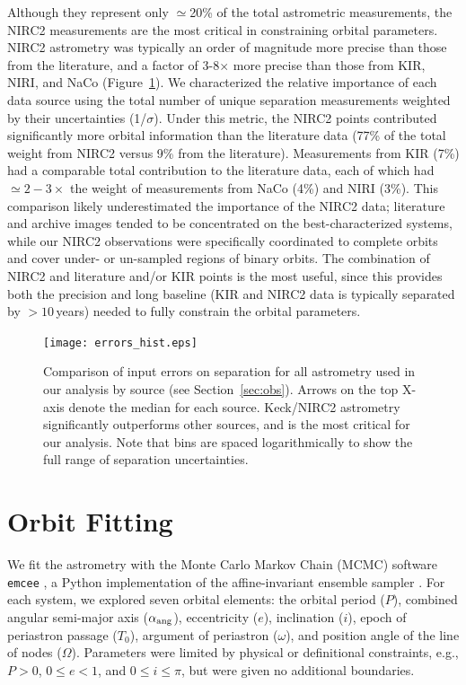 \documentclass[twocolumn]{aastex62}
\begin{document}
Although they represent only $\simeq$20\% of the total astrometric measurements, the NIRC2 measurements are the most critical in constraining orbital parameters. NIRC2 astrometry was typically an order of magnitude more precise than those from the literature, and a factor of 3-8$\times$ more precise than those from KIR, NIRI, and NaCo (Figure~\ref{fig:errors}). We characterized the relative importance of each data source using the total number of unique separation measurements weighted by their uncertainties (1/$\sigma$). Under this metric, the NIRC2 points contributed significantly more orbital information than the literature data (77\% of the total weight from NIRC2 versus 9\% from the literature). Measurements from KIR (7\%) had a comparable total contribution to the literature data, each of which had $\simeq2-3\times$ the weight of measurements from NaCo (4\%) and NIRI (3\%). This comparison likely underestimated the importance of the NIRC2 data; literature and archive images tended to be concentrated on the best-characterized systems, while our NIRC2 observations were specifically coordinated to complete orbits and cover under- or un-sampled regions of binary orbits. The combination of NIRC2 and literature and/or KIR points is the most useful, since this provides both the precision and long baseline (KIR and NIRC2 data is typically separated by $>10$\,years) needed to fully constrain the orbital parameters.

\begin{figure}[htb]
\begin{center}
\texttt{[image: errors\_hist.eps]}
\caption{Comparison of input errors on separation for all astrometry used in our analysis by source (see Section~\ref{sec:obs}). Arrows on the top X-axis denote the median for each source. Keck/NIRC2 astrometry significantly outperforms other sources, and is the most critical for our analysis. Note that bins are spaced logarithmically to show the full range of separation uncertainties. }
\label{fig:errors}
\end{center}
\end{figure}

\section{Orbit Fitting}\label{sec:orbit}

We fit the astrometry with the Monte Carlo Markov Chain (MCMC) software {\tt emcee} \citep{Foreman-Mackey2013}, a Python implementation of the affine-invariant ensemble sampler \citep{goodman2010}. For each system, we explored seven orbital elements: the orbital period ($P$), combined angular semi-major axis ($\alpha_{\rm{ang}}$), eccentricity ($e$), inclination ($i$), epoch of periastron passage ($T_0$), argument of periastron ($\omega$), and position angle of the line of nodes ($\Omega$). Parameters were limited by physical or definitional constraints, e.g., $P>0$, $0 \le e<1$, and $0\le i \le \pi$, but were given no additional boundaries. 
\end{document}
